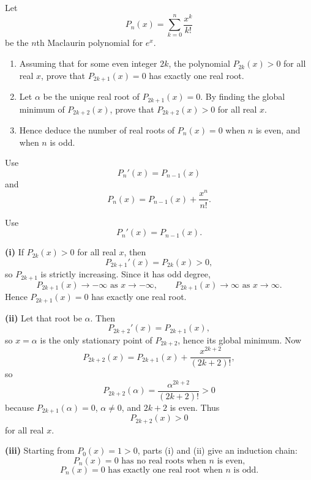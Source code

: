 
\begin{problem}
Let
\[
P_n(x)=\sum_{k=0}^{n}\frac{x^k}{k!}
\]
be the $n$th Maclaurin polynomial for $e^x$.
\begin{enumerate}[label=(\roman*)]
\item Assuming that for some even integer $2k$, the polynomial $P_{2k}(x)>0$ for all real $x$, prove that $P_{2k+1}(x)=0$ has exactly one real root.
\item Let $\alpha$ be the unique real root of $P_{2k+1}(x)=0$. By finding the global minimum of $P_{2k+2}(x)$, prove that $P_{2k+2}(x)>0$ for all real $x$.
\item Hence deduce the number of real roots of $P_n(x)=0$ when $n$ is even, and when $n$ is odd.
\end{enumerate}
\end{problem}

\begin{hintbox}
Use
\[
P_n'(x)=P_{n-1}(x)
\]
and
\[
P_n(x)=P_{n-1}(x)+\frac{x^n}{n!}.
\]
\end{hintbox}

\begin{solution}
Use
\[
P_n'(x)=P_{n-1}(x).
\]

\textbf{(i)} If $P_{2k}(x)>0$ for all real $x$, then
\[
P_{2k+1}'(x)=P_{2k}(x)>0,
\]
so $P_{2k+1}$ is strictly increasing. Since it has odd degree,
\[
P_{2k+1}(x)\to -\infty \text{ as }x\to -\infty,\qquad
P_{2k+1}(x)\to \infty \text{ as }x\to \infty.
\]
Hence $P_{2k+1}(x)=0$ has exactly one real root.

\textbf{(ii)} Let that root be $\alpha$. Then
\[
P_{2k+2}'(x)=P_{2k+1}(x),
\]
so $x=\alpha$ is the only stationary point of $P_{2k+2}$, hence its global minimum.
Now
\[
P_{2k+2}(x)=P_{2k+1}(x)+\frac{x^{2k+2}}{(2k+2)!},
\]
so
\[
P_{2k+2}(\alpha)=\frac{\alpha^{2k+2}}{(2k+2)!}>0
\]
because $P_{2k+1}(\alpha)=0$, $\alpha\ne0$, and $2k+2$ is even.
Thus
\[
P_{2k+2}(x)>0
\]
for all real $x$.

\textbf{(iii)} Starting from $P_0(x)=1>0$, parts (i) and (ii) give an induction chain:
\[
\boxed{P_n(x)=0\text{ has no real roots when }n\text{ is even,}}
\]
\[
\boxed{P_n(x)=0\text{ has exactly one real root when }n\text{ is odd.}}
\]
\end{solution}

